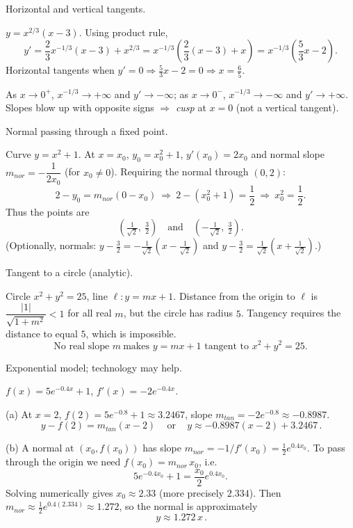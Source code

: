 \documentclass[11pt]{article}
\def\textbf#1{#1}%
\def\mathrm#1{#1}%
\begin{document}
\begin{solution}
\textbf{Horizontal and vertical tangents.}

$y=x^{2/3}(x-3)$. Using product rule,
\[
y'=\frac{2}{3}x^{-1/3}(x-3)+x^{2/3}
= x^{-1/3}\!\left(\frac{2}{3}(x-3)+x\right)
= x^{-1/3}\!\left(\frac{5}{3}x-2\right).
\]
Horizontal tangents when $y'=0 \Rightarrow \tfrac{5}{3}x-2=0 \Rightarrow \boxed{x=\tfrac{6}{5}}$.

As $x\to 0^{+}$, $x^{-1/3}\to +\infty$ and $y'\to -\infty$; as $x\to 0^{-}$, $x^{-1/3}\to -\infty$ and $y'\to +\infty$.  
Slopes blow up with opposite signs $\Rightarrow$ \emph{cusp} at $x=0$ (not a vertical tangent).
\end{solution}

\begin{solution}
\textbf{Normal passing through a fixed point.}

Curve $y=x^2+1$. At $x=x_0$, $y_0=x_0^2+1$, $y'(x_0)=2x_0$ and normal slope $m_{\mathrm{nor}}=-\dfrac{1}{2x_0}$ (for $x_0\neq 0$).  
Requiring the normal through $(0,2)$:
\[
2-y_0=m_{\mathrm{nor}}(0-x_0)\ \Rightarrow\ 2-(x_0^2+1)=\frac{1}{2}\ \Rightarrow\ x_0^2=\frac12.
\]
Thus the points are
\[
\boxed{\left(\tfrac{1}{\sqrt{2}},\ \tfrac{3}{2}\right)}\quad\text{and}\quad
\boxed{\left(-\tfrac{1}{\sqrt{2}},\ \tfrac{3}{2}\right)}.
\]
(Optionally, normals: $y-\tfrac{3}{2}=-\tfrac{1}{\sqrt{2}}\!\left(x-\tfrac{1}{\sqrt{2}}\right)$ and $y-\tfrac{3}{2}=\tfrac{1}{\sqrt{2}}\!\left(x+\tfrac{1}{\sqrt{2}}\right)$.)
\end{solution}

\begin{solution}
\textbf{Tangent to a circle (analytic).}

Circle $x^2+y^2=25$, line $\ell:y=mx+1$.  
Distance from the origin to $\ell$ is $\dfrac{|1|}{\sqrt{1+m^2}}<1$ for all real $m$, but the circle has radius $5$.  
Tangency requires the distance to equal $5$, which is impossible.  
\[
\boxed{\text{No real slope } m\ \text{makes } y=mx+1 \text{ tangent to } x^2+y^2=25.}
\]
\end{solution}

\begin{solution}
\textbf{Exponential model; technology may help.}

$f(x)=5e^{-0.4x}+1$, $f'(x)=-2e^{-0.4x}$.

(a) At $x=2$, $f(2)=5e^{-0.8}+1\approx 3.2467$, slope $m_{\mathrm{tan}}=-2e^{-0.8}\approx -0.8987$.
\[
\boxed{\,y-f(2)=m_{\mathrm{tan}}(x-2)\,}\quad\text{or}\quad
\boxed{\,y\approx -0.8987(x-2)+3.2467\,}.
\]

(b) A normal at $(x_0,f(x_0))$ has slope $m_{\mathrm{nor}}=-1/f'(x_0)=\tfrac{1}{2}e^{0.4x_0}$.
To pass through the origin we need $f(x_0)=m_{\mathrm{nor}}\,x_0$, i.e.
\[
5e^{-0.4x_0}+1=\frac{x_0}{2}e^{0.4x_0}.
\]
Solving numerically gives $\boxed{x_0\approx 2.33}$ (more precisely $2.334$).  
Then $m_{\mathrm{nor}}\approx \tfrac12 e^{0.4(2.334)}\approx 1.272$, so the normal is approximately
\[
\boxed{\,y\approx 1.272\,x\,}.
\]
\end{solution}
\end{document}
